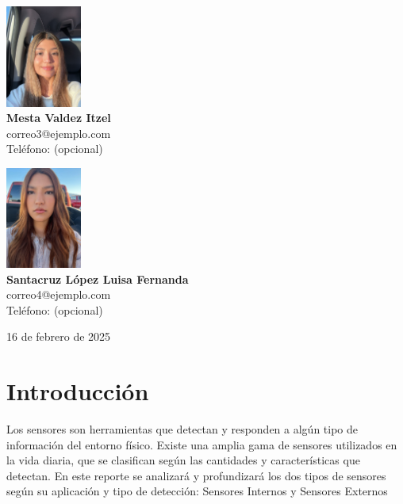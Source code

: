\documentclass{article}
\begin{document}
\begin{titlepage}
\begin{center}
			\begin{minipage}{0.45\textwidth}
				\begin{center}
					\includegraphics[width=2.5cm]{itzel.jpg} \\
					\textbf{Mesta Valdez Itzel} \\
					correo3@ejemplo.com \\
					Teléfono: (opcional)
				\end{center}
			\end{minipage}
			\hfill
			\begin{minipage}{0.45\textwidth}
				\begin{center}
					\includegraphics[width=2.5cm]{luisa.jpg} \\
					\textbf{Santacruz López Luisa Fernanda} \\
					correo4@ejemplo.com \\
					Teléfono: (opcional)
				\end{center}
			\end{minipage}
			
			\vfill
			16 de febrero de 2025
			
		\end{center}
		
	\end{titlepage}
	
	\tableofcontents
	\newpage
	
	\section{Introducción}
	Los sensores son herramientas que detectan y responden a algún tipo de información del entorno físico. Existe una amplia gama de sensores utilizados en la vida diaria, que se clasifican según las cantidades y características que detectan. En este reporte se analizará y profundizará los dos tipos de sensores según su aplicación y tipo de detección: Sensores Internos y Sensores Externos
	
\end{document}
